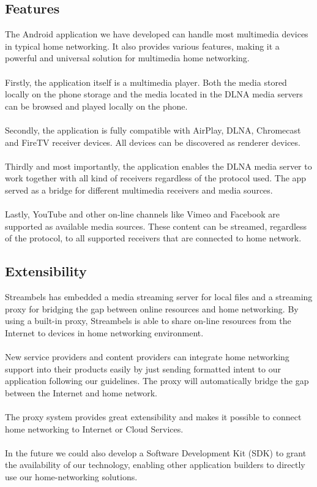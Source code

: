 \subsection{Features}
The Android application we have developed can handle most multimedia devices in typical home networking. It also provides various features, making it a powerful and universal solution for multimedia home networking.\\
\\
Firstly, the application itself is a multimedia player. Both the media stored locally on the phone storage and the media located in the DLNA media servers can be browsed and played locally on the phone.\\
\\
Secondly, the application is fully compatible with AirPlay, DLNA, Chromecast and FireTV receiver devices. All devices can be discovered as renderer devices.\\
\\ 
Thirdly and most importantly, the application enables the DLNA media server to work together with all kind of receivers regardless of the protocol used. The app served as a bridge for different multimedia receivers and media sources.\\
\\
Lastly, YouTube and other on-line channels like Vimeo and Facebook are supported as available media sources. These content can be streamed, regardless of the protocol, to all supported receivers that are connected to home network.

\subsection{Extensibility}
Streambels has embedded a media streaming server for local files and a streaming proxy for bridging the gap between online resources and home networking. By using a built-in proxy, Streambels is able to share on-line resources from the Internet to devices in home networking environment. \\
\\
New service providers and content providers can integrate home networking support into their products easily by just sending formatted intent to our application following our guidelines. The proxy will automatically bridge the gap between the Internet and home network.\\
\\
The proxy system provides great extensibility and makes it possible to connect home networking to Internet or Cloud Services.\\
\\
In the future we could also develop a Software Development Kit (SDK) to grant the availability of our technology, enabling other application builders to directly use our home-networking solutions.
